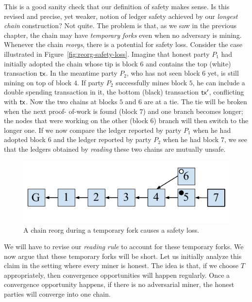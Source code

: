 This is a good sanity check that our definition of safety makes sense. Is this revised and precise, yet weaker, notion of ledger
safety achieved by our \emph{longest chain} construction? Not quite. The problem is that, as we saw in the previous chapter,
the chain may have \emph{temporary forks} even when no adversary is mining. Whenever the chain \emph{reorgs}, there is a
potential for safety loss. Consider the case illustrated in Figure~\ref{fig:reorg-safety-loss}. Imagine that honest party
$P_1$ had initially adopted the chain whose tip is block $6$ and contains the top (white) transaction $\mathsf{tx}$. In the meantime
party $P_2$, who has not seen block $6$ yet, is still mining on top of block $4$. If party $P_2$ successfully mines block
$5$, he can include a double spending transaction in it, the bottom (black) transaction $\mathsf{tx}'$, conflicting with $\mathsf{tx}$.
Now the two chains at blocks $5$ and $6$ are at a tie. The tie will be broken when the next proof-
of-work is found (block $7$) and one branch becomes longer; the nodes that were working on the other
(block $6$) branch will then switch to the longer one. If we now compare the ledger reported by party $P_1$ when he
had adopted block $6$ and the ledger reported by party $P_2$ when he had block $7$, we see that the
ledgers obtained by \emph{reading} these two chains are mutually unsafe.

\begin{figure}[h]
    \centering
    \includegraphics[width=0.5 \columnwidth,keepaspectratio]{figures/reorg-safety-loss.pdf}
    \caption{A chain reorg during a temporary fork causes a safety loss.}
    \label{fig.reorg-safety-loss}
\end{figure}

We will have to revise our \emph{reading rule} to account for these temporary forks. We now argue that these
temporary forks will be short. Let us initially analyze this claim in the setting where every miner is honest.
The idea is that, if we choose $T$ appropriately, then convergence opportunities will happen regularly.
Once a convergence opportunity happens, if there is no adversarial miner, the honest parties will converge into
one chain.

